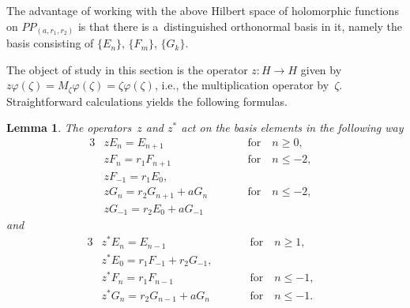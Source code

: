 \documentclass[11pt]{article}
\numberwithin{equation}{section}
\newtheorem{Lemma}[Theorem]{Lemma}
\begin{document}
The advantage of working with the above Hilbert space of holomorphic functions on $PP_{(a, r_1,r_2)}$ is that there is
a~distinguished orthonormal basis in it, namely the basis consisting of $\{E_n\}$, $\{F_m\}$, $\{G_k\}$.

The object of study in this section is the operator $z:H \to H$ given by $z\varphi(\zeta)=M_\zeta \varphi(\zeta) =
\zeta \varphi(\zeta)$, i.e., the multiplication operator by~$\zeta$.
Straightforward calculations yields the following formulas.

\begin{Lemma}
The operators~$z$ and $z^*$ act on the basis elements in the following way
\begin{alignat*}{3}
& zE_n=E_{n+1} \qquad && \text{for} \quad n\ge 0,&
\\
& zF_n=r_1F_{n+1} \qquad && \text{for} \quad n\le -2, &
\\
& zF_{-1}=r_1E_0,&&&
\\
& zG_n=r_2G_{n+1}+aG_n \qquad && \text{for} \quad  n\le -2, &
\\
& zG_{-1}=r_2E_0+aG_{-1}&&&
\end{alignat*}
and
\begin{alignat*}{3}
& z^*E_n=E_{n-1} \qquad && \text{for} \quad  n\ge 1,&
\\
& z^*E_0=r_1F_{-1}+r_2G_{-1}, &&&
\\
& z^*F_n=r_1F_{n-1} \qquad && \text{for} \quad n\le -1,&
\\
& z^*G_n=r_2G_{n-1}+aG_n \qquad && \text{for} \quad n\le -1. &
\end{alignat*}
\end{Lemma}
\end{document}
